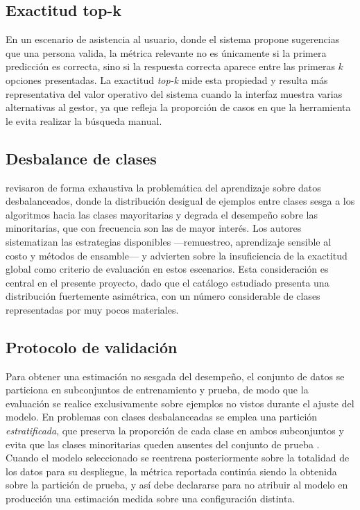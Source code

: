 \subsection{Exactitud top-k}
En un escenario de asistencia al usuario, donde el sistema propone sugerencias que una persona valida, la métrica relevante no es únicamente si la primera predicción es correcta, sino si la respuesta correcta aparece entre las primeras $k$ opciones presentadas. La exactitud \textit{top-k} mide esta propiedad y resulta más representativa del valor operativo del sistema cuando la interfaz muestra varias alternativas al gestor, ya que refleja la proporción de casos en que la herramienta le evita realizar la búsqueda manual.

\subsection{Desbalance de clases}
 revisaron de forma exhaustiva la problemática del aprendizaje sobre datos desbalanceados, donde la distribución desigual de ejemplos entre clases sesga a los algoritmos hacia las clases mayoritarias y degrada el desempeño sobre las minoritarias, que con frecuencia son las de mayor interés. Los autores sistematizan las estrategias disponibles —remuestreo, aprendizaje sensible al costo y métodos de ensamble— y advierten sobre la insuficiencia de la exactitud global como criterio de evaluación en estos escenarios. Esta consideración es central en el presente proyecto, dado que el catálogo estudiado presenta una distribución fuertemente asimétrica, con un número considerable de clases representadas por muy pocos materiales.

\subsection{Protocolo de validación}
Para obtener una estimación no sesgada del desempeño, el conjunto de datos se particiona en subconjuntos de entrenamiento y prueba, de modo que la evaluación se realice exclusivamente sobre ejemplos no vistos durante el ajuste del modelo. En problemas con clases desbalanceadas se emplea una partición \textit{estratificada}, que preserva la proporción de cada clase en ambos subconjuntos y evita que las clases minoritarias queden ausentes del conjunto de prueba \cite{he2009}. Cuando el modelo seleccionado se reentrena posteriormente sobre la totalidad de los datos para su despliegue, la métrica reportada continúa siendo la obtenida sobre la partición de prueba, y así debe declararse para no atribuir al modelo en producción una estimación medida sobre una configuración distinta.

